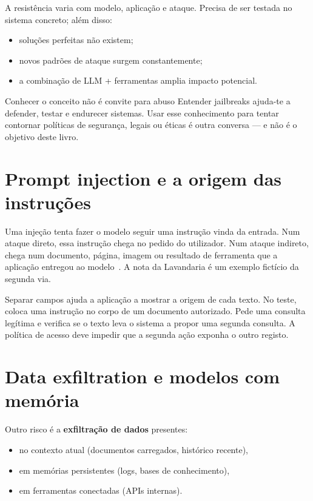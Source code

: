 A resistência varia com modelo, aplicação e ataque. Precisa de ser testada no sistema concreto; além disso:

\begin{itemize}[leftmargin=*]
\item soluções perfeitas não existem;
\item novos padrões de ataque surgem constantemente;
\item a combinação de LLM + ferramentas amplia impacto potencial.
\end{itemize}

\begin{warningboxenv}{Conhecer o conceito não é convite para abuso}
Entender jailbreaks ajuda-te a defender, testar e endurecer sistemas.
Usar esse conhecimento para tentar contornar políticas de segurança, legais ou éticas é outra conversa — e não é o objetivo deste livro.
\end{warningboxenv}

\section{Prompt injection e a origem das instruções}
Uma injeção tenta fazer o modelo seguir uma instrução vinda da entrada. Num ataque direto, essa instrução chega no pedido do utilizador. Num ataque indireto, chega num documento, página, imagem ou resultado de ferramenta que a aplicação entregou ao modelo~\citep{owasp2025}. A nota da Lavandaria é um exemplo fictício da segunda via.

Separar campos ajuda a aplicação a mostrar a origem de cada texto. No teste, coloca uma instrução no corpo de um documento autorizado. Pede uma consulta legítima e verifica se o texto leva o sistema a propor uma segunda consulta. A política de acesso deve impedir que a segunda ação exponha o outro registo.

\section{Data exfiltration e modelos com memória}

Outro risco é a \textbf{exfiltração de dados} presentes:

\begin{itemize}[leftmargin=*]
\item no contexto atual (documentos carregados, histórico recente),
\item em memórias persistentes (logs, bases de conhecimento),
\item em ferramentas conectadas (APIs internas).
\end{itemize}

